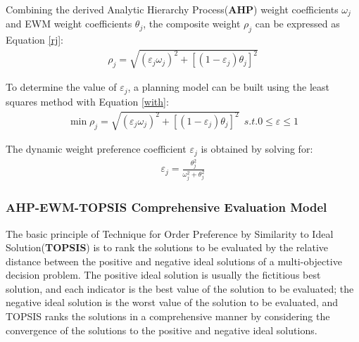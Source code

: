 \documentclass[12pt]{article}  %
\begin{document}
Combining the derived Analytic Hierarchy Process(\textbf{AHP}) weight coefficients $\omega _j$ and EWM weight coefficients $\theta _j$, the composite weight $\rho_j$ can be expressed as Equation \ref{rj}:
\begin{eqnarray}
\rho _j=\sqrt{(\varepsilon _j\omega _j)^2+[(1-\varepsilon _j)\theta _j]^2}\label{rj}
\end{eqnarray}

To determine the value of $\varepsilon_j$, a planning model can be built using the least squares method with Equation \ref{with}:
\begin{eqnarray}
\min\rho _j=\sqrt{(\varepsilon _j\omega _j)^2+[(1-\varepsilon _j)\theta _j]^2} \ \  s.t. 0\le \varepsilon \le 1
\label{with}
\end{eqnarray}

The dynamic weight preference coefficient $\varepsilon _j$ is obtained by solving for:
\begin{eqnarray}
\varepsilon _j=\frac{\theta _j^2}{\omega _j^2+\theta _j^2} 
\end{eqnarray}




























\subsubsection{AHP-EWM-TOPSIS Comprehensive Evaluation Model}
The basic principle of Technique for Order Preference by Similarity to Ideal Solution(\textbf{TOPSIS}) is to rank the solutions to be evaluated by the relative distance between the positive and negative ideal solutions of a multi-objective decision problem. The positive ideal solution is usually the fictitious best solution, and each indicator is the best value of the solution to be evaluated; the negative ideal solution is the worst value of the solution to be evaluated, and TOPSIS ranks the solutions in a comprehensive manner by considering the convergence of the solutions to the positive and negative ideal solutions.
\end{document}

